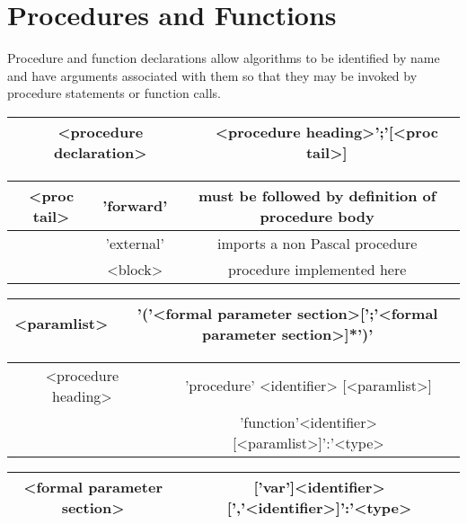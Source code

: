 {\section{Procedures and Functions}

Procedure and function declarations allow algorithms to be identified by name
and have arguments associated with them so that they may be invoked by procedure
statements or function calls. 

\vspace{0.3cm}
{\centering \begin{tabular}{|c|c|}
\hline 
<procedure declaration>&
<procedure heading>';'{[}<proc tail>{]}\\
\hline 
\end{tabular}\par}
\vspace{0.3cm}

\vspace{0.3cm}
{\centering \begin{tabular}{|c|c|c|}
\hline 
<proc tail>&
'forward'&
must be followed by definition of procedure body\\
\hline 
\hline 
&
'external'&
imports a non Pascal procedure\\
\hline 
&
<block>&
procedure implemented here\\
\hline 
\end{tabular}\par}
\vspace{0.3cm}

\vspace{0.3cm}
{\centering \begin{tabular}{|c|c|}
\hline 
<paramlist>&
'('<formal parameter section>{[}';'<formal parameter section>{]}{*}')'\\
\hline 
\end{tabular}\par}
\vspace{0.3cm}

{\centering \begin{tabular}{|c|c|}
\hline 
<procedure heading> &
'procedure' <identifier> {[}<paramlist>{]}\\
&
'function'<identifier> {[}<paramlist>{]}':'<type>\\
\hline 
\end{tabular}\par}
\vspace{0.3cm}

{\centering \begin{tabular}{|c|c|}
\hline 
<formal parameter section>&
{[}'var'{]}<identifier>{[}','<identifier>{]}':'<type>\\
\hline 
\end{tabular}\par}
\vspace{0.3cm}

}

